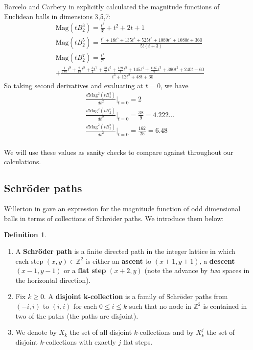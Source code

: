 \documentclass[11pt]{article}
\newcommand{\Z}{\mathbb{Z}}
\theoremstyle{definition}
\newtheorem*{defn}{Definition}
\theoremstyle{definition}
\theoremstyle{plain}
\theoremstyle{plain}
\theoremstyle{plain}
\theoremstyle{definition}
\begin{document}
Barcelo and Carbery in \cite{barcelo_magnitudes_2016} explicitly calculated the magnitude functions of Euclidean balls in dimensions 3,5,7:
\begin{align*}
&\text{Mag}(tB_2^3) = \frac{t^3}{3!}+t^2+2t+1 \\
&\text{Mag}(tB_2^5) = \frac{t^6+18t^5+135t^4+525t^3+1080t^2+1080t+360}{5!(t+3)} \\
&\text{Mag}(tB_2^7) = \frac{t^7}{7!} \\
&+ \frac{\frac{1}{180}t^9+\frac{2}{15}t^8+\frac{3}{2}t^7+\frac{31}{3}t^6+\frac{189}{4}t^5+145t^4+\frac{1165}{4}t^3+360t^2+240t+60}{t^3+12t^2+48t+60}
\end{align*}
So taking second derivatives and evaluating at $t = 0$, we have
\begin{align*}
&\frac{d\text{Mag}^2(tB_2^3)}{dt^2}\big\vert_{t=0} = 2 \\
&\frac{d\text{Mag}^2(tB_2^5)}{dt^2}\big\vert_{t=0} = \frac{38}{9} = 4.222\dots \\
&\frac{d\text{Mag}^2(tB_2^7)}{dt^2}\big\vert_{t=0} = \frac{162}{25} = 6.48 \\
\end{align*}

We will use these values as sanity checks to compare against throughout our calculations.

\subsection*{Schröder paths}

Willerton in \cite{willerton_magnitude_2017} gave an expression for the magnitude function of odd dimensional balls in terms of collections of Schröder paths. We introduce them below:
\begin{defn}
\begin{enumerate}[label=$\bullet$]
\item A \textbf{Schröder path} is a finite directed path in the integer lattice in which each step $(x,y)\in\Z^2$ is either an \textbf{ascent} to $(x+1,y+1)$, a \textbf{descent} $(x-1,y-1)$ or a \textbf{flat step} $(x+2,y)$ (note the advance by \emph{two} spaces in the horizontal direction).
\item Fix $k\geq0$. A \textbf{disjoint k-collection} is a family of Schröder paths from $(-i,i)$ to $(i,i)$ for each $0\leq i\leq k$ such that no node in $\Z^2$ is contained in two of the paths (the paths are disjoint).
\item We denote by $X_k$ the set of all disjoint $k$-collections and by $X_k^j$ the set of disjoint $k$-collections with exactly $j$ flat steps.
\end{enumerate}
\end{defn}
\end{document}

